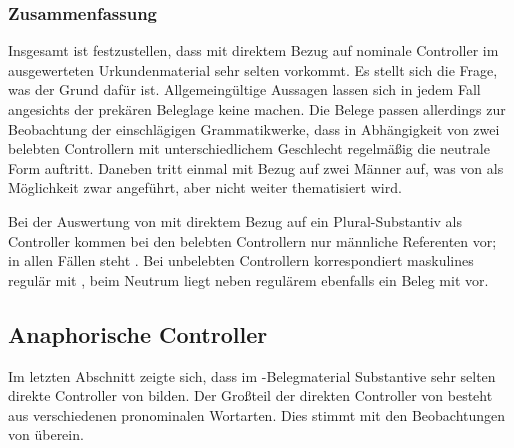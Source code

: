 \begin{exe}
\end{exe}

\subsubsection{Zusammenfassung}

Insgesamt ist festzustellen, dass  mit direktem Bezug auf nominale
Controller im ausgewerteten Urkundenmaterial sehr selten vorkommt. Es stellt
sich die Frage, was der Grund dafür ist. Allgemeingültige Aussagen lassen sich
in jedem Fall angesichts der prekären Beleglage keine machen. Die Belege passen
allerdings zur Beobachtung der einschlägigen Grammatikwerke, dass in
Abhängigkeit von zwei belebten Controllern mit unterschiedlichem
Geschlecht regelmäßig die neutrale Form  auftritt. Daneben tritt
 einmal mit Bezug auf zwei Männer auf, was von
\citet[384]{paul2007} als Möglichkeit zwar angeführt, aber nicht weiter
thematisiert wird.

Bei der Auswertung von  mit direktem Bezug auf ein
Plural-Substantiv als Controller kommen bei den belebten
Controllern nur männliche Referenten vor; in allen Fällen steht .
Bei unbelebten Controllern korrespondiert maskulines 
regulär mit , beim Neutrum liegt neben regulärem 
ebenfalls ein Beleg mit  vor.

\subsection{Anaphorische Controller}
\label{subsec:refctrl}

Im letzten Abschnitt zeigte sich, dass im \CAO{}-Belegmaterial
Substantive sehr selten direkte Controller von 
bilden. Der Großteil der direkten Controller von  besteht aus
verschiedenen pronominalen Wortarten. Dies stimmt mit den Beobachtungen von
\citet[624--625]{ksw2} überein.

